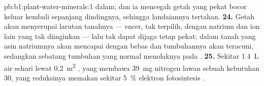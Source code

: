 \begin{solution}{pb:b1:plant-water-minerals:1}
dalam; dan ia mencegah getah  yang pekat bocor keluar kembali
sepanjang dindingnya, sehingga landaiannya tertahan.
\textbf{24.} Getah  akan menyerupai larutan tanahnya ---
encer, tak terpilih, dengan natrium dan ion lain yang tak diinginkan
--- lalu tak dapat dijaga tetap pekat; dalam tanah yang asin natriumnya
akan mencapai  dengan bebas dan tumbuhannya akan teracuni,
sedangkan sebatang tumbuhan yang normal menolaknya pada .
\textbf{25.} Sekitar \qty{1.4}{L} air sehari lewat \qty{0.2}{m^2}
, yang membawa \qty{39}{mg} nitrogen lawan sebuah kebutuhan
\qty{30}{}, yang reduksinya memakan sekitar \qty{5}{\%} elektron
fotosintesis .
\end{solution}
